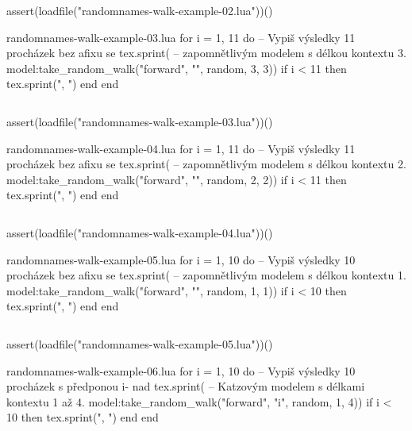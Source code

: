 \documentclass{csbulletin}
\newcommand\myinputminted[3][]{%
  \inputminted[#1]{#2}{#3}%
}
\newcommand\myinputminted[3][]{%
  \inputminted[#1]{#2}{code-placeholder.#2}%
}
\begin{document}
\noindent
\begin{luacode*}
assert(loadfile("randomnames-walk-example-02.lua"))()
\end{luacode*}

\begin{filecontents}{randomnames-walk-example-03.lua}
for i = 1, 11 do -- Vypiš výsledky 11 procházek bez afixu se
  tex.sprint(    -- zapomnětlivým modelem s délkou kontextu 3.
    model:take_random_walk("forward", "", random, 3, 3))
  if i < 11 then tex.sprint(", ") end
end
\end{filecontents}
\myinputminted[linenos=false]{lua}{randomnames-walk-example-03.lua}

\noindent
\begin{luacode*}
assert(loadfile("randomnames-walk-example-03.lua"))()
\end{luacode*}

\begin{filecontents}{randomnames-walk-example-04.lua}
for i = 1, 11 do -- Vypiš výsledky 11 procházek bez afixu se
  tex.sprint(    -- zapomnětlivým modelem s délkou kontextu 2.
    model:take_random_walk("forward", "", random, 2, 2))
  if i < 11 then tex.sprint(", ") end
end
\end{filecontents}
\myinputminted[linenos=false]{lua}{randomnames-walk-example-04.lua}

\noindent
\begin{luacode*}
assert(loadfile("randomnames-walk-example-04.lua"))()
\end{luacode*}

\begin{filecontents}{randomnames-walk-example-05.lua}
for i = 1, 10 do -- Vypiš výsledky 10 procházek bez afixu se
  tex.sprint(    -- zapomnětlivým modelem s délkou kontextu 1.
    model:take_random_walk("forward", "", random, 1, 1))
  if i < 10 then tex.sprint(", ") end
end
\end{filecontents}
\myinputminted[linenos=false]{lua}{randomnames-walk-example-05.lua}

\noindent
\begin{luacode*}
assert(loadfile("randomnames-walk-example-05.lua"))()
\end{luacode*}

\begin{filecontents}{randomnames-walk-example-06.lua}
for i = 1, 10 do -- Vypiš výsledky 10 procházek s předponou i- nad
  tex.sprint(    -- Katzovým modelem s délkami kontextu 1 až 4.
    model:take_random_walk("forward", "i", random, 1, 4))
  if i < 10 then tex.sprint(", ") end
end
\end{filecontents}
\myinputminted[linenos=false]{lua}{randomnames-walk-example-06.lua}
\end{document}
